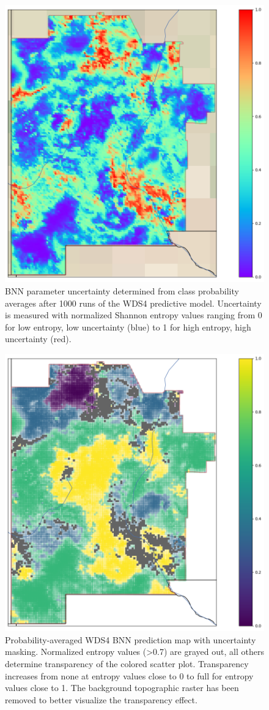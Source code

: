 \begin{figure}%
\centering
\includegraphics[width=.75\textwidth]{templates/images/Figure-BNN_Entropy_Map.png}
\caption[BNN parameter uncertainty map]
{BNN parameter uncertainty determined from class probability averages after 1000 runs of the WDS4 predictive model. Uncertainty is measured with normalized Shannon entropy values ranging from 0 for low entropy, low uncertainty (blue) to 1 for high entropy, high uncertainty (red).}
\label{fig:bnn_entropy_map}
\end{figure}

\begin{figure}%
\centering
\includegraphics[width=.75\textwidth]{templates/images/Figure-BNN_All_Gradient_Map_Masked_whitebackground.png}
\caption[Parameter uncertainty mask on BNN prediction map]
{Probability-averaged WDS4 BNN prediction map with uncertainty masking. Normalized entropy values (>0.7) are grayed out, all others determine transparency of the colored scatter plot. Transparency increases from none at entropy values close to 0 to full for entropy values close to 1. The background topographic raster has been removed to better visualize the transparency effect.}
\label{fig:bnn_masked_pred_map}
\end{figure}

